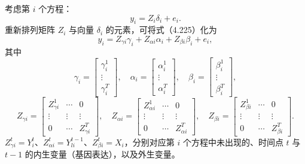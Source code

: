 考虑第 $i$ 个方程：
\begin{equation}
y_i=Z_i\delta_i+e_i.\tag{4.225}
\end{equation}
重新排列矩阵 $Z_i$ 与向量 $\delta_i$ 的元素，可将式（4.225）化为
\begin{equation}
y_i=Z_{\gamma i}\gamma_i+Z_{\alpha i}\alpha_i+Z_{\beta i}\beta_i+e_i,\tag{4.226}
\end{equation}
其中
\[
\gamma_i=\begin{bmatrix}\gamma_i^1\\\vdots\\\gamma_i^T\end{bmatrix},\quad
\alpha_i=\begin{bmatrix}\alpha_i^1\\\vdots\\\alpha_i^T\end{bmatrix},\quad
\beta_i=\begin{bmatrix}\beta_i^1\\\vdots\\\beta_i^T\end{bmatrix},
\]
\[
Z_{\gamma i}=\begin{bmatrix}Z_{\gamma i}^1&\cdots&0\\\vdots&\vdots&\vdots\\0&\cdots&Z_{\gamma i}^T\end{bmatrix},\quad
Z_{\alpha i}=\begin{bmatrix}Z_{\alpha i}^1&\cdots&0\\\vdots&\vdots&\vdots\\0&\cdots&Z_{\alpha i}^T\end{bmatrix},\quad
Z_{\beta i}=\begin{bmatrix}Z_{\beta i}^1&\cdots&0\\\vdots&\vdots&\vdots\\0&\cdots&Z_{\beta i}^T\end{bmatrix}.
\]
$Z_{\gamma i}^t=Y_i^t$、$Z_{\alpha i}^t=Y_{li}^{t-1}$、$Z_{\beta i}^t=X_i$，分别对应第 $i$ 个方程中未出现的、时间点 $t$ 与 $t-1$ 的内生变量（基因表达），以及外生变量。

